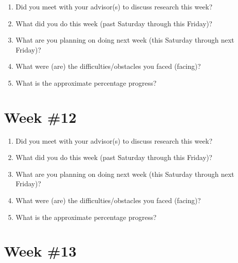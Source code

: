 \documentclass[letterpaper,12pt,fleqn]{article}
\begin{document}
\begin{spacing}{1.50}
  \begin{enumerate}
    \item Did you meet with your advisor(s) to discuss research this week?
          \vfill

    \item What did you do this week (past Saturday through this Friday)? 
          \vfill

    \item What are you planning on doing next week (this Saturday through next Friday)? 
          \vfill

    \item What were (are) the difficulties/obstacles you faced (facing)?
          \vfill

    \item What is the approximate percentage progress?
          \vfill
  \end{enumerate}
\end{spacing}

\clearpage
\section*{Week \#12}

\begin{spacing}{1.50}
  \begin{enumerate}
    \item Did you meet with your advisor(s) to discuss research this week?
          \vfill

    \item What did you do this week (past Saturday through this Friday)? 
          \vfill

    \item What are you planning on doing next week (this Saturday through next Friday)? 
          \vfill

    \item What were (are) the difficulties/obstacles you faced (facing)?
          \vfill

    \item What is the approximate percentage progress?
          \vfill
  \end{enumerate}
\end{spacing}

\clearpage
\section*{Week \#13}
\end{document}

